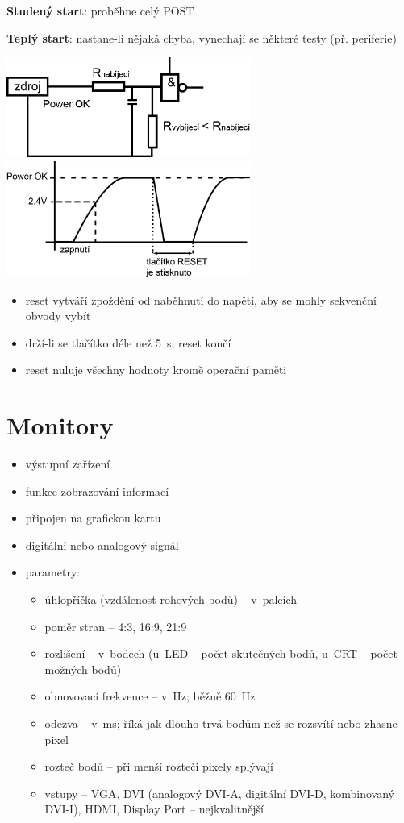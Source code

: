 \documentclass[a4paper,12pt]{article}
\providecommand{\tightlist}{%
\setlength{\itemsep}{0pt}\setlength{\parskip}{0pt}}
\begin{document}
\textbf{Studený start}: proběhne celý POST

\textbf{Teplý start}: nastane-li nějaká chyba, vynechají se některé testy (př. periferie)

\includegraphics[width=8cm]{ref/reset-obvod.png}
\includegraphics[width=8cm]{ref/reset.png}

\begin{itemize}
  \tightlist
  \item reset vytváří zpoždění od naběhnutí do napětí, aby se mohly sekvenční
  obvody vybít
  \item drží-li se tlačítko déle než 5~s, reset končí
  \item reset nuluje všechny hodnoty kromě operační paměti
\end{itemize}

\section{Monitory}

\begin{itemize}
  \tightlist
  \item výstupní zařízení
  \item funkce zobrazování informací
  \item připojen na grafickou kartu
  \item digitální nebo analogový signál
  \item parametry:
  \begin{itemize}
    \tightlist
    \item úhlopříčka (vzdálenost rohových bodů) -- v~palcích
    \item poměr stran -- 4:3, 16:9, 21:9
    \item rozlišení -- v~bodech (u~LED -- počet skutečných bodů, u~CRT -- počet
    možných bodů)
    \item obnovovací frekvence -- v~Hz; běžně 60~Hz
    \item odezva -- v~ms; říká jak dlouho trvá bodům než se rozsvítí nebo zhasne
    pixel
    \item rozteč bodů -- při menší rozteči pixely splývají
    \item vstupy -- VGA, DVI (analogový DVI-A, digitální DVI-D, kombinovaný DVI-I),
    HDMI, Display Port -- nejkvalitnější
  \end{itemize}
\end{itemize}
\end{document}
